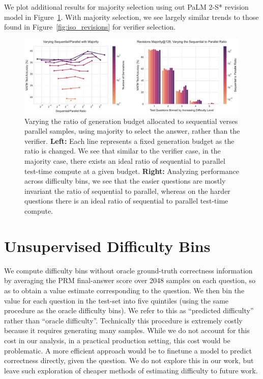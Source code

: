 \documentclass[11pt, letterpaper, logo]{googledeepmind}
\begin{document}
We plot additional results for majority selection using out PaLM 2-S* revision model in Figure~\ref{fig:revision_maj_additional}. With majority selection, we see largely similar trends to those found in Figure~\ref{fig:iso_revisions} for verifier selection.

\begin{figure}
    \centering
    \includegraphics[width=0.99\textwidth]{figures/iso_gens_majority_difficulty.pdf}
    \caption{Varying the ratio of generation budget allocated to sequential verses parallel samples, using majority to select the answer, rather than the verifier. \textbf{Left:} Each line represents a fixed generation budget as the ratio is changed. We see that similar to the verifier case, in the majority case, there exists an ideal ratio of  sequential to parallel test-time compute at a given budget. \textbf{Right:} Analyzing performance across difficulty bins, we see that the easier questions are mostly invariant the ratio of sequential to parallel, whereas on the harder questions there is an ideal ratio of sequential to parallel test-time compute.}
    \label{fig:revision_maj_additional}
\end{figure}

\section{Unsupervised Difficulty Bins}
\label{app:unsupervised_difficulty}

We compute difficulty bins without oracle ground-truth correctness information by averaging the PRM final-answer score over 2048 samples on each question, so as to obtain a value estimate corresponding to the question. We then bin the value for each question in the test-set into five quintiles (using the same procedure as the oracle difficulty bins). We refer to this as ``predicted difficulty'' rather than ``oracle difficulty''. Technically this procedure is extremely costly because it requires generating many samples. While we do not account for this cost in our analysis, in a practical production setting, this cost would be problematic. A more efficient approach would be to finetune a model to predict correctness directly, given the question. We do not explore this in our work, but leave such exploration of cheaper methods of estimating difficulty to future work.
\end{document}
